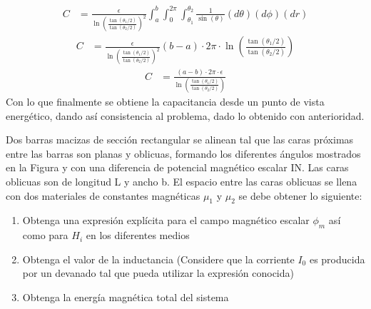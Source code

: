 \documentclass[
  11pt,
  letterpaper,
   addpoints,
   answers
  ]{exam}
\begin{document}
\begin{questions}
\begin{solution}
\begin{enumerate}
    \begin{equation}
        \begin{aligned}
            C &= \frac{\epsilon}{{\ln\left(\frac{\tan(\theta_{1}/2)}{\tan(\theta_{2}/2)}\right)^{2}}} \int_{a}^{b} \int_{0}^{2\pi} \int_{\theta_{1}}^{\theta_{2}}\frac{1}{\sin(\theta)} (d\theta) (d\phi) (dr)
        \end{aligned}
    \end{equation}
    \begin{equation}
        \begin{aligned}
            C &= \frac{\epsilon}{{\ln\left(\frac{\tan(\theta_{1}/2)}{\tan(\theta_{2}/2)}\right)^{2}}} (b-a) \cdot 2\pi \cdot \ln\left(\frac{\tan(\theta_{1}/2)}{\tan(\theta_{2}/2)}\right)
        \end{aligned}
    \end{equation}
    \begin{equation}
        \begin{aligned}
            C &=\frac{(a-b)  \cdot 2\pi \cdot \epsilon}{\ln\left(\frac{\tan(\theta_{1}/2)}{\tan(\theta_{2}/2)}\right)}
        \end{aligned}
    \end{equation}
    Con lo que finalmente se obtiene la capacitancia desde un punto de vista energético, dando así consistencia al problema, dado lo obtenido con anterioridad. 
    \end{enumerate}         
    \end{solution}
    \question  Dos barras macizas de sección rectangular se alinean tal que las caras próximas entre las barras son planas y oblicuas, formando los diferentes ángulos mostrados en la Figura y con una diferencia de potencial magnético escalar IN. Las caras oblicuas son de longitud L y ancho b. El espacio entre las caras oblicuas se llena con dos materiales de constantes magnéticas $\mu_{1}$ y $\mu_{2}$ se debe obtener lo siguiente:
    \begin{enumerate}
        \item Obtenga una expresión explícita para el campo magnético escalar $\phi_{m}$ así como para $H_{i}$ en los diferentes medios 
        \item  Obtenga el valor de la inductancia (Considere que la corriente $I_{0}$ es producida por un devanado tal que pueda utilizar la expresión conocida)
        \item Obtenga la energía magnética total del sistema 
    \end{enumerate}

\end{questions}
\end{document}
